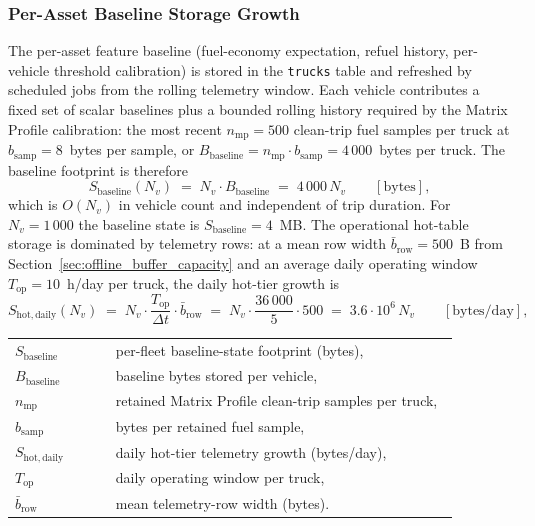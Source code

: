 \subsubsection{Per-Asset Baseline Storage Growth}
\label{sec:scale_storage_growth}

The per-asset feature baseline (fuel-economy expectation, refuel history, per-vehicle threshold calibration) is stored in the \texttt{trucks} table and refreshed by scheduled jobs from the rolling telemetry window. Each vehicle contributes a fixed set of scalar baselines plus a bounded rolling history required by the Matrix Profile calibration: the most recent $n_{\mathrm{mp}} = 500$ clean-trip fuel samples per truck at $b_{\mathrm{samp}} = 8$~bytes per sample, or $B_{\mathrm{baseline}} = n_{\mathrm{mp}} \cdot b_{\mathrm{samp}} = 4\,000$~bytes per truck. The baseline footprint is therefore
\begin{equation}
S_{\mathrm{baseline}}(N_v) \;=\; N_v \cdot B_{\mathrm{baseline}} \;=\; 4\,000\,N_v \qquad [\text{bytes}],
\label{eq:scale_baseline_bytes}
\end{equation}
which is $O(N_v)$ in vehicle count and independent of trip duration. For $N_v = 1\,000$ the baseline state is $S_{\mathrm{baseline}} = 4$~MB. The operational hot-table storage is dominated by telemetry rows: at a mean row width $\bar{b}_{\mathrm{row}} = 500$~B from Section~\ref{sec:offline_buffer_capacity} and an average daily operating window $T_{\mathrm{op}} = 10$~h/day per truck, the daily hot-tier growth is
\begin{equation}
S_{\mathrm{hot,daily}}(N_v) \;=\; N_v \cdot \frac{T_{\mathrm{op}}}{\Delta t} \cdot \bar{b}_{\mathrm{row}}
\;=\; N_v \cdot \frac{36\,000}{5} \cdot 500 \;=\; 3.6 \cdot 10^{6} \, N_v \qquad [\text{bytes/day}],
\label{eq:scale_hot_daily}
\end{equation}
\noindent\begin{tabular}{@{}p{0.20\linewidth}@{\quad}p{0.68\linewidth}@{}}
$S_{\mathrm{baseline}}$ & per-fleet baseline-state footprint (bytes), \\
$B_{\mathrm{baseline}}$ & baseline bytes stored per vehicle, \\
$n_{\mathrm{mp}}$ & retained Matrix Profile clean-trip samples per truck, \\
$b_{\mathrm{samp}}$ & bytes per retained fuel sample, \\
$S_{\mathrm{hot,daily}}$ & daily hot-tier telemetry growth (bytes/day), \\
$T_{\mathrm{op}}$ & daily operating window per truck, \\
$\bar{b}_{\mathrm{row}}$ & mean telemetry-row width (bytes).
\end{tabular}

